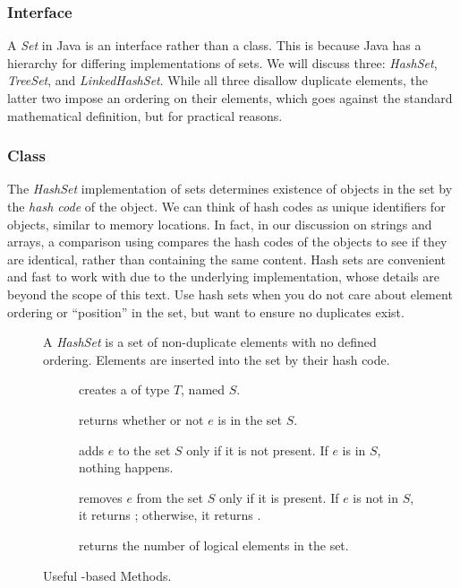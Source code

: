 \subsubsection*{ Interface}
A \textit{Set} in Java is an interface rather than a class. This is because Java has a hierarchy for differing implementations of sets. We will discuss three: \textit{HashSet}, \textit{TreeSet}, and \textit{LinkedHashSet}. While all three disallow duplicate elements, the latter two impose an ordering on their elements, which goes against the standard mathematical definition, but for practical reasons.

\subsubsection*{ Class}
The \textit{HashSet} implementation of sets determines existence of objects in the set by the \textit{hash code} of the object. We can think of hash codes as unique identifiers for objects, similar to memory locations. In fact, in our discussion on strings and arrays, a comparison using \ttt{==} compares the hash codes of the objects to see if they are identical, rather than containing the same content. Hash sets are convenient and fast to work with due to the underlying implementation, whose details are beyond the scope of this text. Use hash sets when you do not care about element ordering or ``position'' in the set, but want to ensure no duplicates exist.
\begin{figure}[tp]
  \small
  \begin{tcolorbox}[title=Java Hash Sets]
    A \textit{HashSet} is a set of non-duplicate elements with no defined ordering. Elements are inserted into the set by their hash code.
    \vspace{2ex}
  \begin{description}
    \item [] creates a  of type $T$, named $S$.
     \item [] returns whether or not $e$ is in the set $S$.
     \item [] adds $e$ to the set $S$ only if it is not present. If $e$ is in $S$, nothing happens.
     \item [] removes $e$ from the set $S$ only if it is present. If $e$ is not in $S$, it returns ; otherwise, it returns .
    \item [] returns the number of logical elements in the set.
  \end{description}
\end{tcolorbox}
  \caption{Useful -based Methods.}
  \label{fig:hashsets}
\end{figure}

